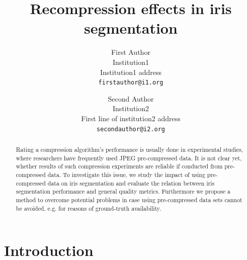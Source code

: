\documentclass[10pt,twocolumn,letterpaper]{article}
\begin{document}
\title{Recompression effects in iris segmentation}

\author{First Author\\
Institution1\\
Institution1 address\\
{\tt\small firstauthor@i1.org}
\and
Second Author\\
Institution2\\
First line of institution2 address\\
{\tt\small secondauthor@i2.org}
}





\maketitle
\thispagestyle{empty}

\begin{abstract}
	
	Rating a compression algorithm's
	performance is usually done in experimental studies, where researchers have frequently used JPEG pre-compressed data. It is not clear yet,
	whether results of such compression experiments are reliable if conducted from pre-compressed data. 
	To investigate this issue, we study the impact of using pre-compressed data on iris segmentation and evaluate the relation between iris segmentation 
	performance and general quality metrics. Furthermore we propose a method to overcome potential problems in case using
	pre-compressed data sets cannot be avoided, e.g. for reasons of ground-truth availability.
\end{abstract}

\section{Introduction}
\end{document}

